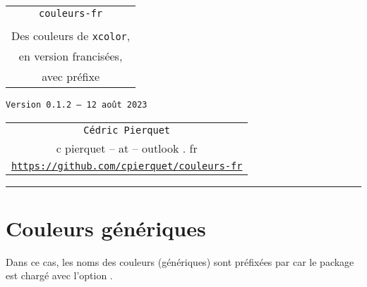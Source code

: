 \documentclass[french,11pt,a4paper]{article}
\def\TPversion{0.1.2}
\def\TPdate{12 août 2023}
\begin{document}
\pagestyle{fancy}

\thispagestyle{empty}

\begin{center}
	\begin{minipage}{0.75\linewidth}
	\begin{tcolorbox}[colframe=yellow,colback=yellow!15]
		\begin{center}
			\begin{tabular}{c}
				{\Huge \texttt{couleurs-fr}}\\
				\\
				{\LARGE Des couleurs de \texttt{xcolor},} \\
				{\LARGE en version francisées,} \\
				{\LARGE avec préfixe}
			\end{tabular}
			
			\medskip
			
			{\small \texttt{Version \TPversion{} -- \TPdate}}
		\end{center}
	\end{tcolorbox}
\end{minipage}
\end{center}

\vspace*{1mm}

\begin{center}
	\begin{tabular}{c}
	\texttt{Cédric Pierquet}\\
	{\ttfamily c pierquet -- at -- outlook . fr}\\
	\texttt{\url{https://github.com/cpierquet/couleurs-fr}}
\end{tabular}
\end{center}

\hrule

\vspace*{5mm}


\section{Couleurs génériques}

Dans ce cas, les noms des couleurs (génériques) sont préfixées par  car le package est chargé avec l'option \MontreCode{[Prefixe]}.
\end{document}
